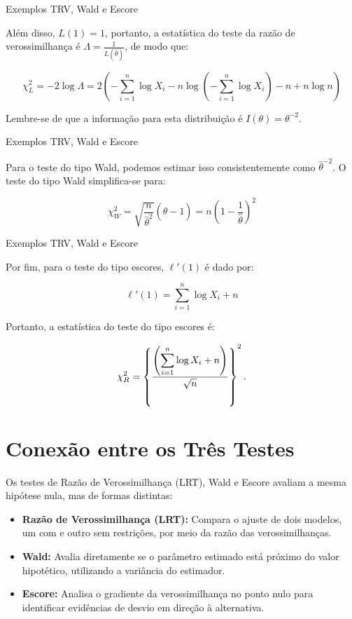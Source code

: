 \documentclass[12pt]{beamer}
\begin{document}
\begin{frame}{Exemplos TRV, Wald e Escore}
\begin{block}{}
\justifying
Além disso, \(L(1) = 1\), portanto, a estatística do teste da razão de verossimilhança é \(\Lambda = \frac{1}{L(\hat{\theta})}\), de modo que:

{\small
\[\chi^2_L = -2 \log \Lambda = 2\left(- \sum_{i=1}^n \log X_i - n \log\left(-\sum_{i=1}^n \log X_i\right) - n + n \log n\right)\]
}

Lembre-se de que a informação para esta distribuição é \(I(\theta) = \theta^{-2}\). 
\end{block}
\end{frame}

\begin{frame}{Exemplos TRV, Wald e Escore}
\begin{block}{}
\justifying
Para o teste do tipo Wald, podemos estimar isso consistentemente como \(\hat{\theta}^{-2}\). O teste do tipo Wald simplifica-se para:

\[\chi^2_W = \sqrt{\dfrac{n}{\hat{\theta}^{2}}}(\hat{\theta}-1)=n\left(1 - \frac{1}{\hat{\theta}}\right)^2\]
\end{block}
\end{frame}


\begin{frame}{Exemplos TRV, Wald e Escore}
\begin{block}{}
\justifying
Por fim, para o teste do tipo escores, \(\ell'(1)\) é dado por:

\[\ell'(1) = \sum_{i=1}^n \log X_i + n\]

Portanto, a estatística do teste do tipo escores é:

\[\chi^2_R = \left\{\dfrac{\left({\displaystyle \sum_{i=1}^{n}} \log X_i + n\right)}{\sqrt{n}}\right\}^{2}.\]
\end{block}
\end{frame}

\section{Conexão entre os Três Testes}
\begin{frame}
	\begin{block}{}
\justifying		
		Os testes de Razão de Verossimilhança (LRT), Wald e Escore avaliam a mesma hipótese nula, mas de formas distintas:
		
		\begin{itemize}
			\justifying
			\item \textbf{Razão de Verossimilhança (LRT):} Compara o ajuste de dois modelos, um com e outro sem restrições, por meio da razão das verossimilhanças.\pause
			\item \textbf{Wald:} Avalia diretamente se o parâmetro estimado está próximo do valor hipotético, utilizando a variância do estimador.\pause
			\item \textbf{Escore:} Analisa o gradiente da verossimilhança no ponto nulo para identificar evidências de desvio em direção à alternativa.
		\end{itemize}
	\end{block}
\end{frame}
\end{document}
